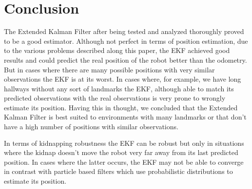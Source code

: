 \section{Conclusion}
\label{sec:Conclusion}


The Extended Kalman Filter after being tested and analyzed thoroughly proved to be a good estimator. Although not perfect in terms of position estimation, due to the various problems described along this paper, the EKF achieved good results and could predict the real position of the robot better than the odometry. But in cases where there are many possible positions with very similar observations the EKF is at its worst. In cases where, for example, we have long hallways without any sort of landmarks the EKF, although able to match its predicted observations with the real observations is very prone to wrongly estimate its position. Having this in thought, we concluded that the Extended Kalman Filter is best suited to environments with many landmarks or that don't have a high number of positions with similar observations. 

In terms of kidnapping robustness the EKF can be robust but only in situations where the kidnap doesn't move the robot very far away from its last predicted position. In cases where the latter occurs, the EKF may not be able to converge in contrast with particle based filters which use probabilistic distributions to estimate its position.



